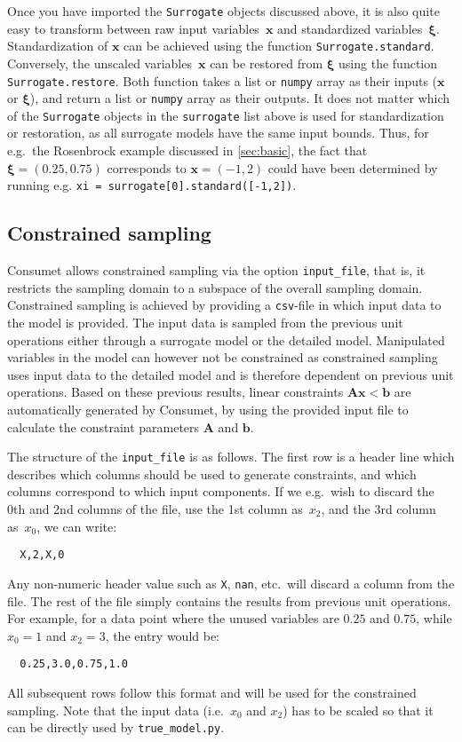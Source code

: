 \documentclass[a4paper,bibliography=numbered]{scrartcl}
\begin{document}
Once you have imported the \texttt{Surrogate} objects discussed above, it is also quite easy to transform between raw input variables~$\bm{x}$ and standardized variables~$\bm{\xi}$.
Standardization of $\bm{x}$ can be achieved using the function \texttt{Surrogate.standard}.
Conversely, the unscaled variables~$\bm{x}$ can be restored from $\bm{\xi}$ using the function \texttt{Surrogate.restore}.
Both function takes a list or \texttt{numpy} array as their inputs ($\bm{x}$ or $\bm{\xi}$), and return a list or \texttt{numpy} array as their outputs.
It does not matter which of the \texttt{Surrogate} objects in the \texttt{surrogate} list above is used for standardization or restoration, as all surrogate models have the same input bounds.
Thus, for e.g.\ the Rosenbrock example discussed in \cref{sec:basic}, the fact that $\bm{\xi} = (0.25,0.75)$ corresponds to $\bm{x} = (-1,2)$ could have been determined by running e.g. \texttt{xi = surrogate[0].standard([-1,2])}.



\subsection{Constrained sampling}\label{sec:constraint}
Consumet allows constrained sampling via the option \texttt{input\_file}, that is, it restricts the sampling domain to a subspace of the overall sampling domain.
Constrained sampling is achieved by providing a \texttt{csv}-file in which input data to the model is provided.
The input data is sampled from the previous unit operations either through a surrogate model or the detailed model.
Manipulated variables in the model can however not be constrained as constrained sampling uses input data to the detailed model and is therefore dependent on previous unit operations.
Based on these previous results, linear constraints $\bm{A}\bm{x} < \bm{b}$ are automatically generated by Consumet, by using the provided input file to calculate the constraint parameters $\bm{A}$ and $\bm{b}$.

The structure of the \texttt{input\_file} is as follows.
The first row is a header line which describes which columns should be used to generate constraints, and which columns correspond to which input components.
If we e.g.\ wish to discard the 0th and 2nd columns of the file, use the 1st column as~$x_2$, and the 3rd column as~$x_0$, we can write:
\begin{lstlisting}
  X,2,X,0
\end{lstlisting}
Any non-numeric header value such as \texttt{X}, \texttt{nan}, etc.\ will discard a column from the file.
The rest of the file simply contains the results from previous unit operations.
For example, for a data point where the unused variables are $0.25$ and $0.75$, while $x_0 = 1$ and $x_2 = 3$, the entry would be:
\begin{lstlisting}
  0.25,3.0,0.75,1.0
\end{lstlisting}
All subsequent rows follow this format and will be used for the constrained sampling.
Note that the input data (i.e.\ $x_0$ and $x_2$) has to be scaled so that it can be directly used by \texttt{true\_model.py}.
\end{document}
